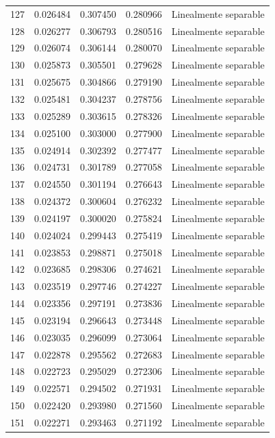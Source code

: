 \begin{tabular}{lllll}
127 & 0.026484 & 0.307450 & 0.280966 & Linealmente separable \\
128 & 0.026277 & 0.306793 & 0.280516 & Linealmente separable \\
129 & 0.026074 & 0.306144 & 0.280070 & Linealmente separable \\
130 & 0.025873 & 0.305501 & 0.279628 & Linealmente separable \\
131 & 0.025675 & 0.304866 & 0.279190 & Linealmente separable \\
132 & 0.025481 & 0.304237 & 0.278756 & Linealmente separable \\
133 & 0.025289 & 0.303615 & 0.278326 & Linealmente separable \\
134 & 0.025100 & 0.303000 & 0.277900 & Linealmente separable \\
135 & 0.024914 & 0.302392 & 0.277477 & Linealmente separable \\
136 & 0.024731 & 0.301789 & 0.277058 & Linealmente separable \\
137 & 0.024550 & 0.301194 & 0.276643 & Linealmente separable \\
138 & 0.024372 & 0.300604 & 0.276232 & Linealmente separable \\
139 & 0.024197 & 0.300020 & 0.275824 & Linealmente separable \\
140 & 0.024024 & 0.299443 & 0.275419 & Linealmente separable \\
141 & 0.023853 & 0.298871 & 0.275018 & Linealmente separable \\
142 & 0.023685 & 0.298306 & 0.274621 & Linealmente separable \\
143 & 0.023519 & 0.297746 & 0.274227 & Linealmente separable \\
144 & 0.023356 & 0.297191 & 0.273836 & Linealmente separable \\
145 & 0.023194 & 0.296643 & 0.273448 & Linealmente separable \\
146 & 0.023035 & 0.296099 & 0.273064 & Linealmente separable \\
147 & 0.022878 & 0.295562 & 0.272683 & Linealmente separable \\
148 & 0.022723 & 0.295029 & 0.272306 & Linealmente separable \\
149 & 0.022571 & 0.294502 & 0.271931 & Linealmente separable \\
150 & 0.022420 & 0.293980 & 0.271560 & Linealmente separable \\
151 & 0.022271 & 0.293463 & 0.271192 & Linealmente separable \\

\end{tabular}
